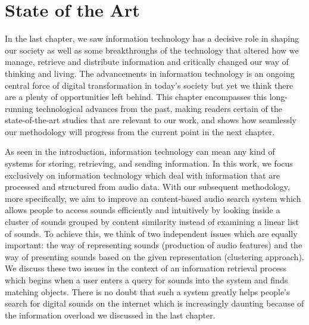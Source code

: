 \normallinespacing

\chapter{State of the Art}

In the last chapter, we saw information technology has a decisive role in shaping our society as well as some breakthroughs of the technology that altered how we manage, retrieve and distribute information and critically changed our way of thinking and living. The advancements in information technology is an ongoing central force of digital transformation in today's society but yet we think there are a plenty of opportunities left behind. This chapter encompasses this long-running technological advances from the past, making readers certain of the state-of-the-art studies that are relevant to our work, and shows how seamlessly our methodology will progress from the current point in the next chapter. 

As seen in the introduction, information technology can mean any kind of systems for storing, retrieving, and sending information. In this work, we focus exclusively on information technology which deal with information that are processed and structured from audio data. 
With our subsequent methodology, more specifically, we aim to improve an content-based audio search system which allows people to access sounds efficiently and intuitively by looking inside a cluster of sounds grouped by content similarity instead of examining a linear list of sounds.
To achieve this, we think of two independent issues which are equally important: the way of representing sounds (production of audio features) and the way of presenting sounds based on the given representation (clustering approach). We discuss these two issues in the context of an information retrieval process which begins when a user enters a query for sounds into the system and finds matching objects. There is no doubt that such a system greatly helps people's search for digital sounds on the internet which is increasingly daunting because of the information overload we discussed in the last chapter.


